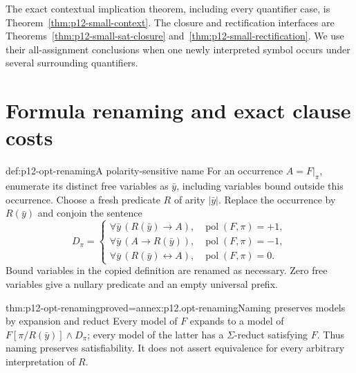 The exact contextual implication theorem, including every quantifier
case, is Theorem~\ref{thm:p12-small-context}. The closure and
rectification interfaces are Theorems~\ref{thm:p12-small-sat-closure}
and~\ref{thm:p12-small-rectification}. We use their all-assignment
conclusions when one newly interpreted symbol occurs under several
surrounding quantifiers.

\section{Formula renaming and exact clause costs}
\begin{hbdefinition}{def:p12-opt-renaming}{A polarity-sensitive name}
For an occurrence \(A=F|_\pi\), enumerate its distinct free variables
as \(\bar y\), including variables bound outside this occurrence.
Choose a fresh predicate \(R\) of arity \(|\bar y|\).
Replace the occurrence by \(R(\bar y)\) and conjoin the sentence
\[
 D_\pi=
 \begin{cases}
 \forall\bar y\,(R(\bar y)\to A),&\operatorname{pol}(F,\pi)=+1,\\
 \forall\bar y\,(A\to R(\bar y)),&\operatorname{pol}(F,\pi)=-1,\\
 \forall\bar y\,(R(\bar y)\leftrightarrow A),&
                  \operatorname{pol}(F,\pi)=0.
 \end{cases}
\]
Bound variables in the copied definition are renamed as necessary.
Zero free variables give a nullary predicate and an empty universal
prefix.
\end{hbdefinition}

\begin{hbtheorem}{thm:p12-opt-renaming}{proved=annex:p12.opt-renaming}{Naming preserves models by expansion and reduct}
Every model of \(F\) expands to a model of
\(F[\pi/R(\bar y)]\land D_\pi\); every model of the latter has a
\(\Sigma\)-reduct satisfying \(F\). Thus naming preserves satisfiability.
It does not assert equivalence for every arbitrary interpretation of \(R\).
\end{hbtheorem}

